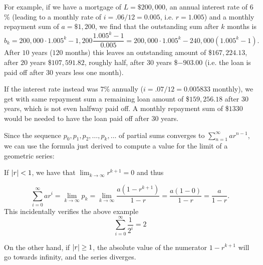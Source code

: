 For example, if we have a mortgage of $L=\$200,000$, an annual
interest rate of $6$\% (leading to a monthly rate of
$i=.06/12=0.005$, i.e. $r=1.005$) and a monthly repayment
sum of $a=\$1,200$, we find that the outstanding sum after
$k$ months is
\[
b_k=200,000\cdot{1.005^k}-1,200\frac{1.005^k-1}{0.005}
=200,000\cdot{1.005^k}-240,000\left(1.005^k-1\right).
\]
After $10$ years ($120$ months) this leaves an outstanding amount of
{\$}$167,224.13$, after $20$ years {\$}$107,591.82$, roughly
half, after $30$
years {\$}$-903.00$ (i.e. the loan is paid off after $30$ years less
one month).

If the interest rate instead was $7$\% annually ($i=.07/12=0.005833$
monthly), we get with same repayment sum a remaining loan amount of
{\$}$159,256.18$ after $30$ years, which is not even halfway paid
off. A monthly repayment sum of {\$}$1330$ would be
needed
to have the loan paid off after $30$ years.
\medskip

Since the sequence $p_0, p_{1}, p_{2}, 
\ldots, p_{k}, \ldots$ of partial sums converges to
$\displaystyle{\sum_{n=1}^{\infty} ar^{n-1}}$, we can use the
formula just derived to compute a value for the limit of a geometric series:

If $\left|r\right|<1$, we have that $\lim_{k\to\infty} r^{k+1}=0$ and thus

\[
\sum_{i=0}^{\infty} ar^i
=
\lim_{k\to\infty} p_k=
\lim_{k \rightarrow \infty} \frac{a (1-r^{k+1})}{1-r} =
\frac{a(1-0)}{1-r}=\frac{a}{1-r}.
\]
This incidentally verifies the above example
\[
\sum_{i=0}^\infty \frac{1}{2^i}=2
\]

On the other hand, if $\left|r\right|\ge 1$, the absolute value of the numerator
$1-r^{k+1}$ will go towards infinity, and the series diverges.


